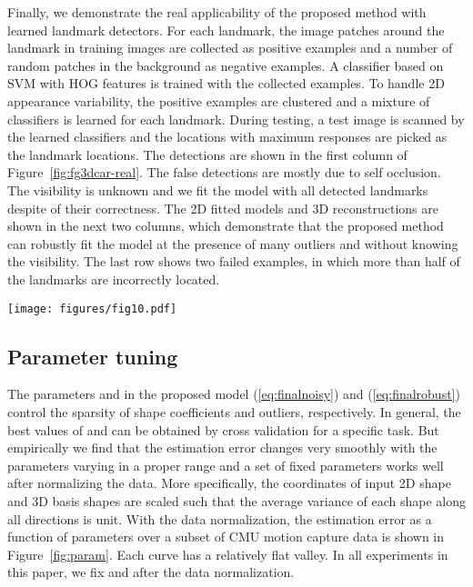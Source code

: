 \documentclass[10pt,journal,cspaper,compsoc]{IEEEtran}
\newcommand{\refEq}[1]{(\ref{#1})}
\newcommand{\refFig}[1]{Figure~\ref{#1}}
\begin{document}
Finally, we demonstrate the real applicability of the proposed method with learned landmark detectors. For each landmark, the image patches around the landmark in training images are collected as positive examples and a number of random patches in the background as negative examples. A classifier based on SVM with HOG features is trained with the collected examples. To handle 2D appearance variability, the positive examples are clustered and a mixture of classifiers is learned for each landmark. During testing, a test image is scanned by the learned classifiers and the locations with maximum responses are picked as the landmark locations. The detections are shown in the first column of \refFig{fig:fg3dcar-real}. The false detections are mostly due to self occlusion. The visibility is unknown and we fit the model with all detected landmarks despite of their correctness. The 2D fitted models and 3D reconstructions are shown in the next two columns, which demonstrate that the proposed method can robustly fit the model at the presence of many outliers and without knowing the visibility. The last row shows two failed examples, in which more than half of the landmarks are incorrectly located.

\begin{figure*}
  \centering
  \texttt{[image: figures/fig10.pdf]}\\
  \caption{Qualitative results on the FG3DCar dataset with detected 2D landmarks. In each example, the detected landmarks superposed on the original image, 2D fitted model and 3D reconstruction are shown. The 2D landmarks are located by learned detectors based on HOG and SVM. The green and red dots correspond to the inliers and outliers, respectively. The outlier is defined as any detected landmark at least 30-pixel away from the manual annotation. Note that the inlier/outlier classification is only for the purpose of illustration and not for model fitting, i.e., the models are fitted with all landmarks despite of the correctness of detection. The last row shows two failed examples.} \label{fig:fg3dcar-real}
\end{figure*}

\subsection{Parameter tuning}
The parameters  and  in the proposed model \refEq{eq:finalnoisy} and \refEq{eq:finalrobust} control the sparsity of shape coefficients and outliers, respectively. In general, the best values of  and  can be obtained by cross validation for a specific task. But empirically we find that the estimation error changes very smoothly with the parameters varying in a proper range and a set of fixed parameters works well after normalizing the data. More specifically, the coordinates of input 2D shape and 3D basis shapes are scaled such that the average variance of each shape along all directions is unit. With the data normalization, the estimation error as a function of parameters over a subset of CMU motion capture data is shown in \refFig{fig:param}. Each curve has a relatively flat valley. In all experiments in this paper, we fix  and  after the data normalization.
\end{document}
